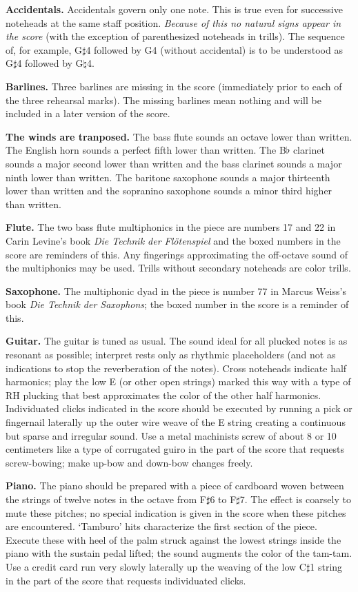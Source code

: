 \textbf{Accidentals.} Accidentals govern only one note. This is true even for
successive noteheads at the same staff position. \textit{Because of this no
natural signs appear in the score} (with the exception of parenthesized
noteheads in trills). The sequence of, for example, G$\sharp$4 followed by
G4 (without accidental) is to be understood as G$\sharp$4 followed by
G$\natural$4.

\textbf{Barlines.} Three barlines are missing in the score (immediately prior
to each of the three rehearsal marks). The missing barlines mean nothing and
will be included in a later version of the score.

\textbf{The winds are tranposed.} The bass flute sounds an octave lower than
written. The English horn sounds a perfect fifth lower than written. The
B$\flat$ clarinet sounds a major second lower than written and the bass
clarinet sounds a major ninth lower than written. The baritone saxophone sounds
a major thirteenth lower than written and the sopranino saxophone sounds a
minor third higher than written.

\textbf{Flute.} The two bass flute multiphonics in the piece are numbers 17 and
22 in Carin Levine's book \textit{Die Technik der Flötenspiel} and the boxed
numbers in the score are reminders of this. Any fingerings approximating the
off-octave sound of the multiphonics may be used. Trills without secondary
noteheads are color trills.

\textbf{Saxophone.} The multiphonic dyad in the piece is number 77 in Marcus
Weiss's book \textit{Die Technik der Saxophons}; the boxed number in the score
is a reminder of this.

\textbf{Guitar.} The guitar is tuned as usual. The sound ideal for all plucked
notes is as resonant as possible; interpret rests only as rhythmic placeholders
(and not as indications to stop the reverberation of the notes). Cross
noteheads indicate half harmonics; play the low E (or other open strings)
marked this way with a type of RH plucking that best approximates the color of
the other half harmonics. Individuated clicks indicated in the score should be
executed by running a pick or fingernail laterally up the outer wire weave of
the E string creating a continuous but sparse and irregular sound. Use a metal
machinists screw of about 8 or 10 centimeters like a type of corrugated guiro
in the part of the score that requests screw-bowing; make up-bow and down-bow
changes freely.

\textbf{Piano.} The piano should be prepared with a piece of cardboard woven
between the strings of twelve notes in the octave from F$\sharp$6 to
F$\sharp$7. The effect is coarsely to mute these pitches; no special indication
is given in the score when these pitches are encountered. `Tamburo' hits
characterize the first section of the piece. Execute these with heel of the
palm struck against the lowest strings inside the piano with the sustain pedal
lifted; the sound augments the color of the tam-tam. Use a credit card run very
slowly laterally up the weaving of the low C$\sharp$1 string in the part of the
score that requests individuated clicks.

